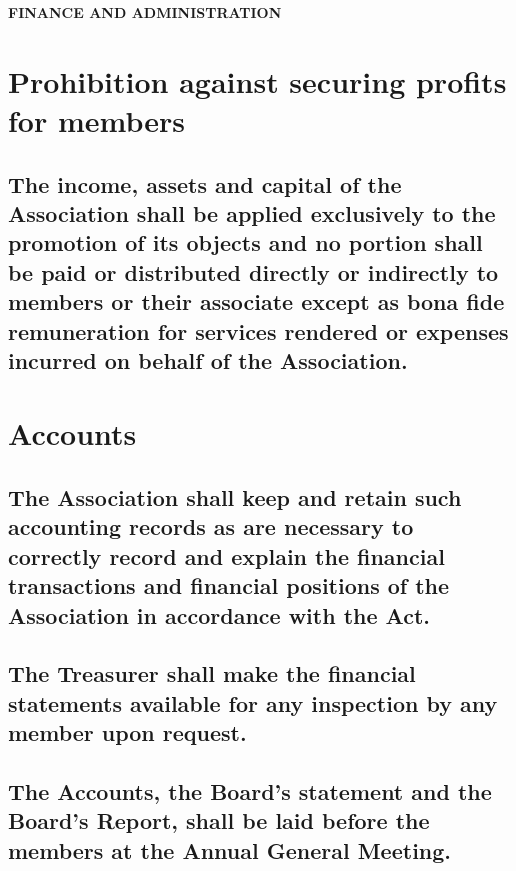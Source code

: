 \documentclass{article}
\newenvironment{subs}
  {\adjustwidth{2em}{0pt}}
  {\endadjustwidth}
\begin{document}
\vspace{5mm}
{\large\bf FINANCE AND ADMINISTRATION\par}
\hrulefill
\vspace{5mm}

\section{Prohibition against securing profits for members}
\begin{subs}
\subsection{The income, assets and capital of the Association shall be applied exclusively to the promotion of its objects and no portion shall be paid or distributed directly or indirectly to members or their associate except as bona fide remuneration for services rendered or expenses incurred on behalf of the Association.}
\end{subs}


\section{Accounts}
\begin{subs}
\subsection{The Association shall keep and retain such accounting records as are necessary to correctly record and explain the financial transactions and financial positions of the Association in accordance with the Act.}
\subsection{The Treasurer shall make the financial statements available for any inspection by any member upon request.}
\subsection{The Accounts, the Board's statement and the Board's Report, shall be laid before the members at the Annual General Meeting.}
\end{subs}
\end{document}
